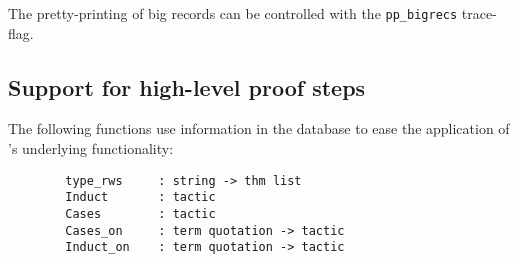 The pretty-printing of big records can be controlled with the
\texttt{pp\_bigrecs} trace-flag.


\subsection{Support for high-level proof steps}

The following functions use information in the database to ease the
application of \holn{}'s underlying functionality:

\begin{verbatim}
        type_rws     : string -> thm list
        Induct       : tactic
        Cases        : tactic
        Cases_on     : term quotation -> tactic
        Induct_on    : term quotation -> tactic
\end{verbatim}

